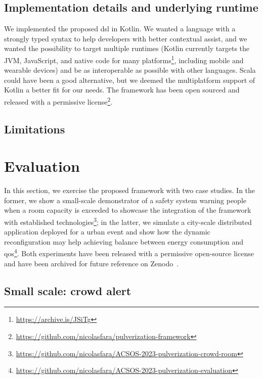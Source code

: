 \documentclass[conference]{IEEEtran}
\begin{document}
% 

\subsection{Implementation details and underlying runtime}

We implemented the proposed \ac{dsl} in Kotlin.
%
We wanted a language with a strongly typed syntax to help developers with better contextual assist,
and we wanted the possibility to target multiple runtimes
(Kotlin currently targets the JVM, JavaScript, and native code for many platforms\footnote{\url{https://archive.is/JSiTg}},
including mobile and wearable devices)
and be as interoperable as possible with other languages.
%
Scala could have been a good alternative,
but we deemed the multiplatform support of Kotlin a better fit for our needs.
%
The framework has been open sourced and released with a permissive license\footnote{\url{https://github.com/nicolasfara/pulverization-framework}}.

\subsection{Limitations}

\section{Evaluation}\label{sec:evaluation}

In this section,
we exercise the proposed framework with two case studies.
%
In the former,
we show a small-scale demonstrator of a safety system warning people when a room capacity is exceeded
to showcase the integration of the framework with established technologies\footnote{
    \url{https://github.com/nicolasfara/ACSOS-2023-pulverization-crowd-room}
};
in the latter,
we simulate a city-scale distributed application deployed for a urban event
and show how the dynamic reconfiguration may help achieving balance between energy consumption and \ac{qos}\footnote{
    \url{https://github.com/nicolasfara/ACSOS-2023-pulverization-evaluation}
}.
%
Both experiments have been released with a permissive open-source license and have been archived for future reference on Zenodo~\cite{TBD}.

\subsection{Small scale: crowd alert}
\label{sec:small-scale-crowd-alert}
\end{document}
